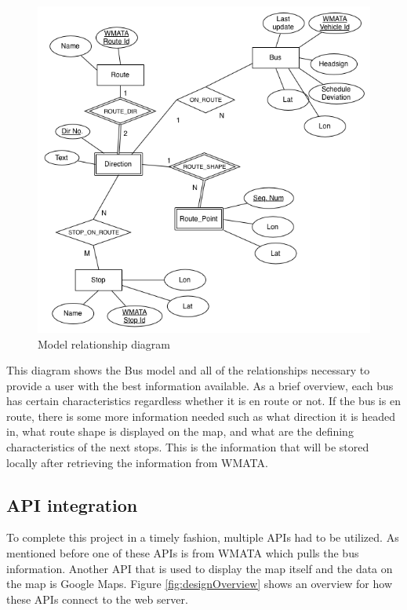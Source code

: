 \documentclass[12pt]{article}
\begin{document}
\begin{figure}[ht]
	\centerline{\includegraphics[scale=0.43]{bus-entity-rel.png}}
	\caption{Model relationship diagram}
	\label{fig:busEntity}
\end{figure}

This diagram shows the Bus model and all of the relationships necessary to provide a user with the best information available.  As a brief overview, each bus has certain characteristics regardless whether it is en route or not.  If the bus is en route, there is some more information needed such as what direction it is headed in, what route shape is displayed on the map, and what are the defining characteristics of the next stops.  This is the information that will be stored locally after retrieving the information from WMATA.

\subsection*{API integration}

To complete this project in a timely fashion, multiple APIs had to be utilized.  As mentioned before one of these APIs is from WMATA which pulls the bus information. Another API that is used to display the map itself and the data on the map is Google Maps.  Figure \ref{fig:designOverview} shows an overview for how these APIs connect to the web server.
\end{document}
